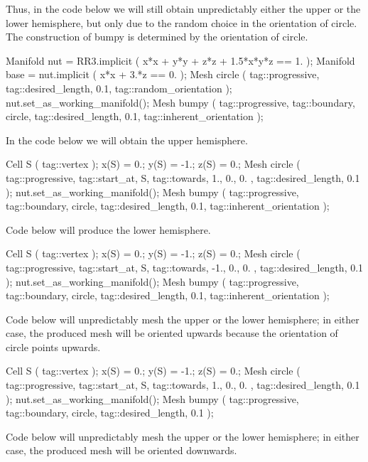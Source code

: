 Thus, in the code below we will still obtain unpredictably either the upper or the lower
hemisphere, but only due to the random choice in the orientation of {\codett circle}.
The construction of {\codett bumpy} is determined by the orientation of {\codett circle}.

\verbatim
   Manifold nut = RR3.implicit ( x*x + y*y + z*z + 1.5*x*y*z == 1. );
   Manifold base = nut.implicit ( x*x + 3.*z == 0. );
   Mesh circle
      ( tag::progressive, tag::desired_length, 0.1, tag::random_orientation );
   nut.set_as_working_manifold();
   Mesh bumpy ( tag::progressive, tag::boundary, circle,
                tag::desired_length, 0.1, tag::inherent_orientation );
\endverbatim

In the code below we will obtain the upper hemisphere.

\verbatim
   Cell S ( tag::vertex );    x(S) =  0.;  y(S) = -1.;  z(S) =  0.;
   Mesh circle ( tag::progressive, tag::start_at, S, tag::towards, { 1., 0., 0. },
                 tag::desired_length, 0.1                                          );
   nut.set_as_working_manifold();
   Mesh bumpy ( tag::progressive, tag::boundary, circle,
                tag::desired_length, 0.1, tag::inherent_orientation );
\endverbatim

Code below will produce the lower hemisphere.

\verbatim
   Cell S ( tag::vertex );    x(S) =  0.;  y(S) = -1.;  z(S) =  0.;
   Mesh circle ( tag::progressive, tag::start_at, S, tag::towards, { -1., 0., 0. },
                 tag::desired_length, 0.1                                           );
   nut.set_as_working_manifold();
   Mesh bumpy ( tag::progressive, tag::boundary, circle,
                tag::desired_length, 0.1, tag::inherent_orientation );
\endverbatim

Code below will unpredictably mesh the upper or the lower hemisphere;
in either case, the produced mesh will be oriented upwards because the orientation
of {\codett circle} points upwards.

\verbatim
   Cell S ( tag::vertex );    x(S) =  0.;  y(S) = -1.;  z(S) =  0.;
   Mesh circle ( tag::progressive, tag::start_at, S, tag::towards, { 1., 0., 0. },
                 tag::desired_length, 0.1                                          );
   nut.set_as_working_manifold();
   Mesh bumpy ( tag::progressive, tag::boundary, circle, tag::desired_length, 0.1 );
\endverbatim

Code below will unpredictably mesh the upper or the lower hemisphere;
in either case, the produced mesh will be oriented downwards.

